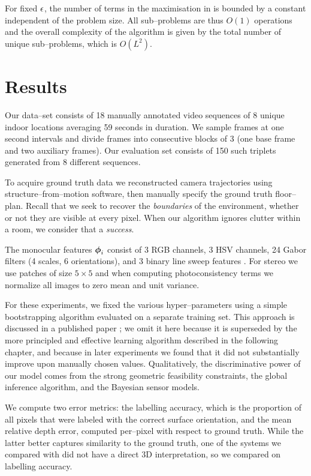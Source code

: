 For fixed $\RoundoffEps$, the number of terms in the maximisation in
 is bounded by a constant independent of
the problem size. All sub--problems are thus $O(1)$ operations and the
overall complexity of the algorithm is given by the total number of
unique sub--problems, which is $O(L^2)$.

\section{Results}
\label{sec:results}
Our data--set consists of 18 manually annotated video sequences of 8
unique indoor locations averaging 59 seconds in duration. We sample
frames at one second intervals and divide frames into consecutive
blocks of 3 (one base frame and two auxiliary frames). Our evaluation
set consists of 150 such triplets generated from 8 different
sequences.

To acquire ground truth data we reconstructed camera trajectories
using structure--from--motion software, then manually specify the
ground truth floor--plan. Recall that we seek to recover the
\textit{boundaries} of the environment, whether or not they are
visible at every pixel. When our algorithm ignores clutter within a
room, we consider that a \textit{success}.

The monocular features $\Feature_i$ consist of 3 RGB channels, 3 HSV
channels, 24 Gabor filters (4 scales, 6 orientations), and 3 binary
line sweep features \cite{Lee09}. For stereo we use patches of size
$5 \times 5$ and when computing photoconsistency terms we normalize
all images to zero mean and unit variance.

For these experiments, we fixed the various hyper--parameters using a
simple bootstrapping algorithm evaluated on a separate training
set. This approach is discussed in a published paper \cite{Flint11};
we omit it here because it is superseded by the more principled and
effective learning algorithm described in the following chapter, and
because in later experiments we found that it did not substantially
improve upon manually chosen values. Qualitatively, the discriminative
power of our model comes from the strong geometric feasibility
constraints, the global inference algorithm, and the Bayesian sensor
models.

We compute two error metrics: the labelling accuracy, which is the
proportion of all pixels that were labeled with the correct surface
orientation, and the mean relative depth error, computed per--pixel
with respect to ground truth. While the latter better captures
similarity to the ground truth, one of the systems we compared with
did not have a direct 3D interpretation, so we compared on labelling
accuracy.

